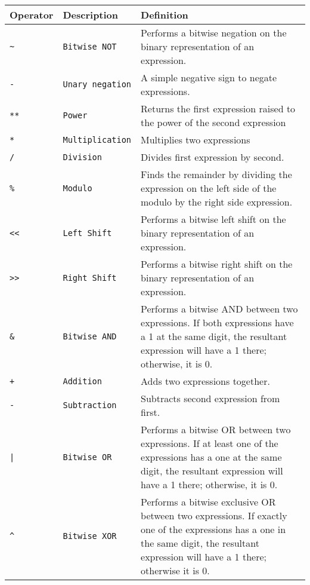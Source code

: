 			\begin{table}[H]
			\begin{tabular}{ |p{2cm}|p{3cm}|p{8cm}|  }
			\hline
			\textbf{Operator} & \textbf{Description} & \textbf{Definition} \\ \hline
			\texttt{\~} & \texttt{Bitwise NOT } & {Performs a bitwise negation on the binary representation of an expression.} \\
			\texttt{-} & \texttt{Unary negation} & {A simple negative sign to negate expressions.} \\ \hline
			\texttt{**} & \texttt{Power} & {Returns the first expression raised to the power of the second expression} \\ \hline
			\texttt{*} & \texttt{Multiplication} & {Multiplies two expressions} \\
			\texttt{/} & \texttt{Division} & {Divides first expression by second}. \\
			\texttt{\%} & \texttt{Modulo} & {Finds the remainder by dividing the expression on the left side of the modulo by the right side expression.} \\
			\texttt{<<} & \texttt{Left Shift} & {Performs a bitwise left shift on the binary representation of an expression.} \\
			\texttt{>>} & \texttt{Right Shift} & {Performs a bitwise right shift on the binary representation of an expression.} \\
			\texttt{\&} & \texttt{Bitwise AND} & {Performs a bitwise AND between two expressions. If both expressions have a 1 at the same digit, the resultant expression will have a 1 there; otherwise, it is 0.} \\ \hline
			\texttt{+} & \texttt{Addition} & {Adds two expressions together.} \\
			\texttt{-} & \texttt{Subtraction} & {Subtracts second expression from first.} \\
			\texttt{|} & \texttt{Bitwise OR} & {Performs a bitwise OR between two expressions. If at least one of the expressions has a one at the same digit, the resultant expression will have a 1 there; otherwise, it is 0.} \\
			\texttt{\^} & \texttt{Bitwise XOR} & {Performs a bitwise exclusive OR between two expressions. If exactly one of the expressions has a one in the same digit, the resultant expression will have a 1 there; otherwise it is 0.} \\ \hline
			\end{tabular}
			\end{table}

